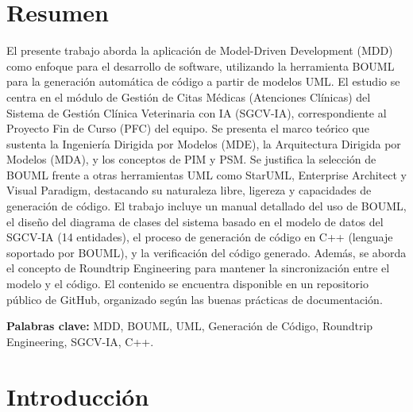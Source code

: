 \documentclass[12pt,a4paper]{article}
\begin{document}

\newpage
\tableofcontents
\newpage
\listoffigures
\newpage
\listoftables

\newpage
\section*{Resumen}

El presente trabajo aborda la aplicación de Model-Driven Development (MDD) como enfoque para el desarrollo de software, utilizando la herramienta BOUML para la generación automática de código a partir de modelos UML. El estudio se centra en el módulo de Gestión de Citas Médicas (Atenciones Clínicas) del Sistema de Gestión Clínica Veterinaria con IA (SGCV-IA), correspondiente al Proyecto Fin de Curso (PFC) del equipo. Se presenta el marco teórico que sustenta la Ingeniería Dirigida por Modelos (MDE), la Arquitectura Dirigida por Modelos (MDA), y los conceptos de PIM y PSM. Se justifica la selección de BOUML frente a otras herramientas UML como StarUML, Enterprise Architect y Visual Paradigm, destacando su naturaleza libre, ligereza y capacidades de generación de código. El trabajo incluye un manual detallado del uso de BOUML, el diseño del diagrama de clases del sistema basado en el modelo de datos del SGCV-IA (14 entidades), el proceso de generación de código en C++ (lenguaje soportado por BOUML), y la verificación del código generado. Además, se aborda el concepto de Roundtrip Engineering para mantener la sincronización entre el modelo y el código. El contenido se encuentra disponible en un repositorio público de GitHub, organizado según las buenas prácticas de documentación.

\noindent\textbf{Palabras clave:} MDD, BOUML, UML, Generación de Código, Roundtrip Engineering, SGCV-IA, C++.

\newpage
\section{Introducción}
\end{document}
